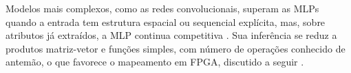 Modelos mais complexos, como as redes convolucionais, superam as MLPs quando a entrada tem estrutura espacial ou sequencial explícita, mas, sobre atributos já extraídos, a MLP continua competitiva \cite{abd2023multi}. Sua inferência se reduz a produtos matriz-vetor e funções simples, com número de operações conhecido de antemão, o que favorece o mapeamento em FPGA, discutido a seguir \cite{Shawahna2019}.
